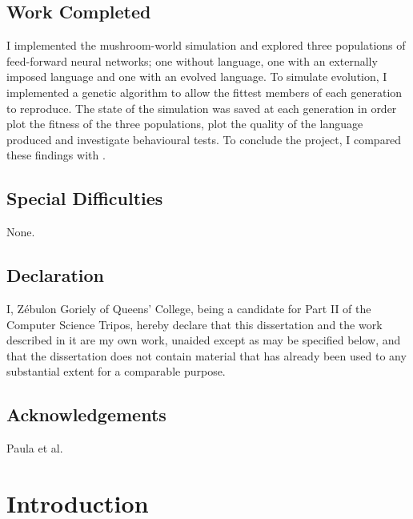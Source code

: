 \documentclass[12pt,a4paper,twoside,openright]{report}
\begin{document}
\section*{Work Completed}

I implemented the mushroom-world simulation and explored three populations of feed-forward neural networks; one without language, one with an externally imposed language and one with an evolved language. To simulate evolution, I implemented a genetic algorithm to allow the fittest members of each generation to reproduce. The state of the simulation was saved at each generation in order plot the fitness of the three populations, plot the quality of the language produced and investigate behavioural tests. To conclude the project, I compared these findings with \citet{Cangelosi1998}.

\section*{Special Difficulties}

None.
 
\newpage
\section*{Declaration}

I, Z\'ebulon Goriely of Queens' College, being a candidate for Part II of the Computer
Science Tripos, hereby declare
that this dissertation and the work described in it are my own work,
unaided except as may be specified below, and that the dissertation
does not contain material that has already been used to any substantial
extent for a comparable purpose.

\bigskip
{}

\medskip
{}

\tableofcontents

\listoffigures

\newpage
\section*{Acknowledgements}

Paula et al.


\pagestyle{headings}

\chapter{Introduction}
\end{document}

